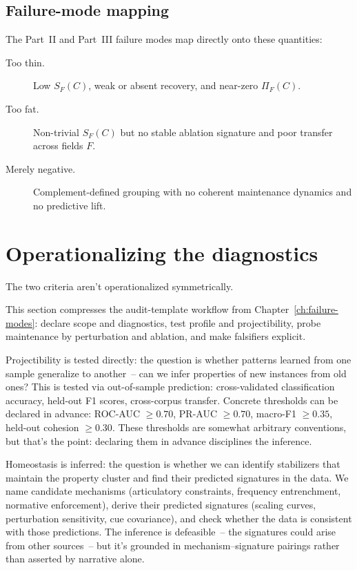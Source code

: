 \subsection*{Failure-mode mapping}

The Part~II and Part~III failure modes map directly onto these quantities:
\begin{description}
    \item[Too thin.] Low $S_F(C)$, weak or absent recovery, and near-zero $\Pi_F(C)$.
    \item[Too fat.] Non-trivial $S_F(C)$ but no stable ablation signature and poor transfer across fields $F$.
    \item[Merely negative.] Complement-defined grouping with no coherent maintenance dynamics and no predictive lift.
\end{description}

\section{Operationalizing the diagnostics}

The two criteria aren't operationalized symmetrically.

This section compresses the audit-template workflow from Chapter~\ref{ch:failure-modes}: declare scope and diagnostics, test profile and projectibility, probe maintenance by perturbation and ablation, and make falsifiers explicit.

Projectibility is tested directly: the question is whether patterns learned from one sample generalize to another~-- can we infer properties of new instances from old ones? This is tested via out-of-sample prediction: cross-validated classification accuracy, held-out F1 scores, cross-corpus transfer. Concrete thresholds can be declared in advance: ROC-AUC $\geq 0.70$, PR-AUC $\geq 0.70$, macro-F1 $\geq 0.35$, held-out cohesion $\geq 0.30$. These thresholds are somewhat arbitrary conventions, but that's the point: declaring them in advance disciplines the inference.

Homeostasis is inferred: the question is whether we can identify stabilizers that maintain the property cluster and find their predicted signatures in the data. We name candidate mechanisms (articulatory constraints, frequency entrenchment, normative enforcement), derive their predicted signatures (scaling curves, perturbation sensitivity, cue covariance), and check whether the data is consistent with those predictions. The inference is defeasible~-- the signatures could arise from other sources~-- but it's grounded in mechanism--signature pairings rather than asserted by narrative alone.

